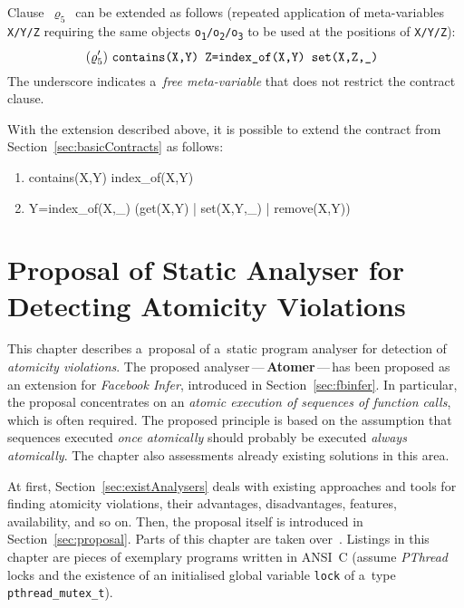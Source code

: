 Clause~$ \varrho_5 $~can be extended as follows (repeated application of
meta-variables \texttt{X/Y/Z} requiring the same objects
\texttt{o\textsubscript{1}/o\textsubscript{2}/o\textsubscript{3}} to be used
at the positions of \texttt{X/Y/Z}):
$$
    (\varrho^\prime_5)\ \text{\texttt{%
        contains(X,Y) Z=index\_of(X,Y) set(X,Z,\_)
    }}
$$
The underscore indicates a~\emph{free meta-variable} that does not restrict
the contract clause.

With the extension described above, it is possible to extend the contract
from Section~\ref{sec:basicContracts} as follows:
\begin{enumerate}[label={$ (\varrho^\prime_{\arabic*}) $}]
    \tt

    \item contains(X,Y) index\_of(X,Y)
    \item Y=index\_of(X,\_) (get(X,Y) | set(X,Y,\_) | remove(X,Y))
\end{enumerate}



\chapter{Proposal of Static Analyser for Detecting Atomicity Violations}
\label{chap:proposal}

This chapter describes a~proposal of a~static program analyser for
detection of \emph{atomicity violations}. The proposed
analyser\,---\,\textbf{Atomer}\,---\,has been proposed as an extension
for \emph{Facebook Infer}, introduced in Section~\ref{sec:fbinfer}. In
particular, the proposal concentrates on an \emph{atomic execution of
sequences of function calls}, which is often required. The
proposed principle is based on the assumption that sequences executed
\emph{once atomically} should probably be executed \emph{always atomically}.
The chapter also assessments already existing solutions in this area.

At first, Section~\ref{sec:existAnalysers} deals with
existing approaches and tools for finding atomicity violations, their
advantages, disadvantages, features, availability, and so on. Then,
the proposal itself is introduced in Section~\ref{sec:proposal}. Parts of
this chapter are taken over~\cite{excel2019FBInfer}. Listings in this
chapter are pieces of exemplary programs written in ANSI~C (assume
\emph{PThread} locks and the existence of an initialised global variable
\texttt{lock} of a~type \texttt{pthread\_mutex\_t}).


